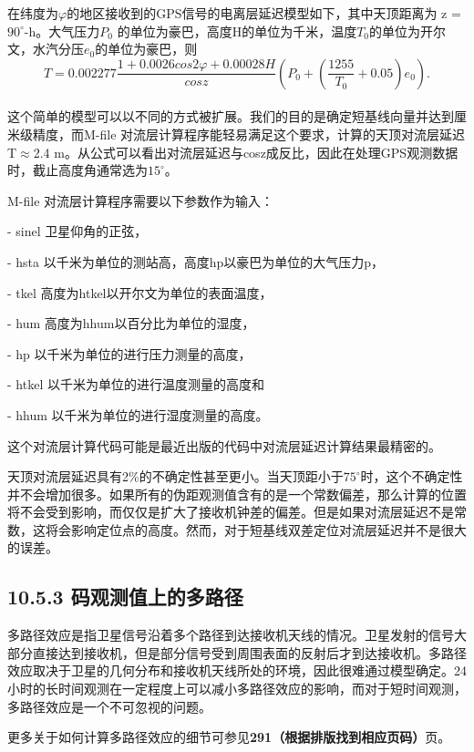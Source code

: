 在纬度为$\varphi$的地区接收到的GPS信号的电离层延迟模型如下，其中天顶距离为 z = $90^{\circ}$-h。大气压力$P_{0}$ 的单位为豪巴，高度H的单位为千米，温度$T_{0}$的单位为开尔文，水汽分压$e_{0}$的单位为豪巴，则
\begin{equation}
	T=0.002277\frac{1+0.0026cos2\varphi+0.00028H}{cosz}(P_{0}+(\frac{1255}{T_{0}}+0.05)e_{0}).
\end{equation}\\

这个简单的模型可以以不同的方式被扩展。我们的目的是确定短基线向量并达到厘米级精度，而M-file 对流层计算程序能轻易满足这个要求，计算的天顶对流层延迟T$\approx$2.4 m。从公式可以看出对流层延迟与cosz成反比，因此在处理GPS观测数据时，截止高度角通常选为$15^{\circ}$。

M-file 对流层计算程序需要以下参数作为输入：

- sinel  卫星仰角的正弦，

- hsta  以千米为单位的测站高，高度hp以豪巴为单位的大气压力p，

- tkel  高度为htkel以开尔文为单位的表面温度，

- hum  高度为hhum以百分比为单位的湿度，

- hp  以千米为单位的进行压力测量的高度，

- htkel  以千米为单位的进行温度测量的高度和

- hhum  以千米为单位的进行湿度测量的高度。

这个对流层计算代码可能是最近出版的代码中对流层延迟计算结果最精密的。

天顶对流层延迟具有2\%的不确定性甚至更小。当天顶距小于$75^{\circ}$时，这个不确定性并不会增加很多。如果所有的伪距观测值含有的是一个常数偏差，那么计算的位置将不会受到影响，而仅仅是扩大了接收机钟差的偏差。但是如果对流层延迟不是常数，这将会影响定位点的高度。然而，对于短基线双差定位对流层延迟并不是很大的误差。

\subsection{10.5.3 码观测值上的多路径}

多路径效应是指卫星信号沿着多个路径到达接收机天线的情况。卫星发射的信号大部分直接达到接收机，但是部分信号受到周围表面的反射后才到达接收机。多路径效应取决于卫星的几何分布和接收机天线所处的环境，因此很难通过模型确定。24小时的长时间观测在一定程度上可以减小多路径效应的影响，而对于短时间观测，多路径效应是一个不可忽视的问题。

更多关于如何计算多路径效应的细节可参见\textbf{291（根据排版找到相应页码）}页。